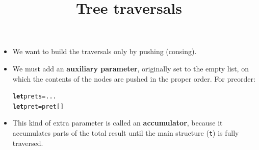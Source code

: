 \documentclass[wide]{slides}
\begin{document}
\begin{slide}
  \title{Tree traversals}

  \begin{itemize}

    \item We want to build the traversals only by pushing (consing).

    \item We must add an \textbf{auxiliary parameter}, originally set
      to the empty list, on which the contents of the nodes are pushed
      in the proper order. For preorder:
\begin{alltt}
\textbf{let} pre t s = ...
\textbf{let} pre t = pre t []
\end{alltt}

    \item This kind of extra parameter is called an
      \textbf{accumulator}, because it accumulates parts of the total
      result until the main structure (\texttt{t}) is fully traversed.


\end{itemize}
\end{slide}
\end{document}
